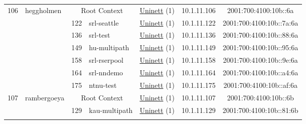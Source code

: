 \begin{small}
\begin{center}
\begin{longtable}{|c|c|c|c|c|c|c|c|}
 \multirow{7}{*}{\tiny{106}} & \multicolumn{1}{|l|}{\multirow{7}{*}{\tiny{heggholmen}}} & \multicolumn{2}{|c|}{\tiny{Root Context}} & \multicolumn{2}{|c|}{\tiny{\href{https://www.uninett.no}{Uninett} (1)}} & \tiny{10.1.11.106} & \tiny{2001:700:4100:10b::6a} \\* \cline{3-3}\cline{4-4}\cline{5-5}\cline{6-6}\cline{7-7}\cline{8-8}
  &  & \tiny{122} & \multicolumn{1}{|l|}{\tiny{srl-seattle}} & \multicolumn{2}{|c|}{\tiny{\href{https://www.uninett.no}{Uninett} (1)}} & \tiny{10.1.11.122} & \tiny{2001:700:4100:10b::7a:6a} \\* \cline{3-3}\cline{4-4}\cline{5-5}\cline{6-6}\cline{7-7}\cline{8-8}
  &  & \tiny{136} & \multicolumn{1}{|l|}{\tiny{srl-test}} & \multicolumn{2}{|c|}{\tiny{\href{https://www.uninett.no}{Uninett} (1)}} & \tiny{10.1.11.136} & \tiny{2001:700:4100:10b::88:6a} \\* \cline{3-3}\cline{4-4}\cline{5-5}\cline{6-6}\cline{7-7}\cline{8-8}
  &  & \tiny{149} & \multicolumn{1}{|l|}{\tiny{hu-multipath}} & \multicolumn{2}{|c|}{\tiny{\href{https://www.uninett.no}{Uninett} (1)}} & \tiny{10.1.11.149} & \tiny{2001:700:4100:10b::95:6a} \\* \cline{3-3}\cline{4-4}\cline{5-5}\cline{6-6}\cline{7-7}\cline{8-8}
  &  & \tiny{158} & \multicolumn{1}{|l|}{\tiny{srl-rserpool}} & \multicolumn{2}{|c|}{\tiny{\href{https://www.uninett.no}{Uninett} (1)}} & \tiny{10.1.11.158} & \tiny{2001:700:4100:10b::9e:6a} \\* \cline{3-3}\cline{4-4}\cline{5-5}\cline{6-6}\cline{7-7}\cline{8-8}
  &  & \tiny{164} & \multicolumn{1}{|l|}{\tiny{srl-nndemo}} & \multicolumn{2}{|c|}{\tiny{\href{https://www.uninett.no}{Uninett} (1)}} & \tiny{10.1.11.164} & \tiny{2001:700:4100:10b::a4:6a} \\* \cline{3-3}\cline{4-4}\cline{5-5}\cline{6-6}\cline{7-7}\cline{8-8}
  &  & \tiny{175} & \multicolumn{1}{|l|}{\tiny{ntnu-test}} & \multicolumn{2}{|c|}{\tiny{\href{https://www.uninett.no}{Uninett} (1)}} & \tiny{10.1.11.175} & \tiny{2001:700:4100:10b::af:6a} \\ \hline
 \multirow{8}{*}{\tiny{107}} & \multicolumn{1}{|l|}{\multirow{8}{*}{\tiny{rambergoeya}}} & \multicolumn{2}{|c|}{\tiny{Root Context}} & \multicolumn{2}{|c|}{\tiny{\href{https://www.uninett.no}{Uninett} (1)}} & \tiny{10.1.11.107} & \tiny{2001:700:4100:10b::6b} \\* \cline{3-3}\cline{4-4}\cline{5-5}\cline{6-6}\cline{7-7}\cline{8-8}
  &  & \tiny{129} & \multicolumn{1}{|l|}{\tiny{kau-multipath}} & \multicolumn{2}{|c|}{\tiny{\href{https://www.uninett.no}{Uninett} (1)}} & \tiny{10.1.11.129} & \tiny{2001:700:4100:10b::81:6b} \\* \cline{3-3}\cline{4-4}\cline{5-5}\cline{6-6}\cline{7-7}\cline{8-8}

\end{longtable}
\end{center}
\end{small}
